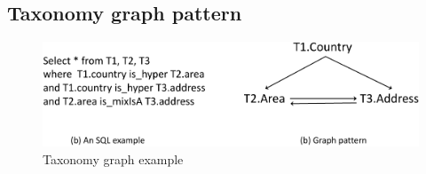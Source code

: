 \documentclass{sig-alternate}
\begin{document}

\subsection{Taxonomy graph pattern}

\begin{figure}[t]
\centering
\includegraphics[scale=0.5]{figures/tgsql}
 \caption{Taxonomy graph example }
\label{fig:taxonomy}
\end{figure}
\end{document}
